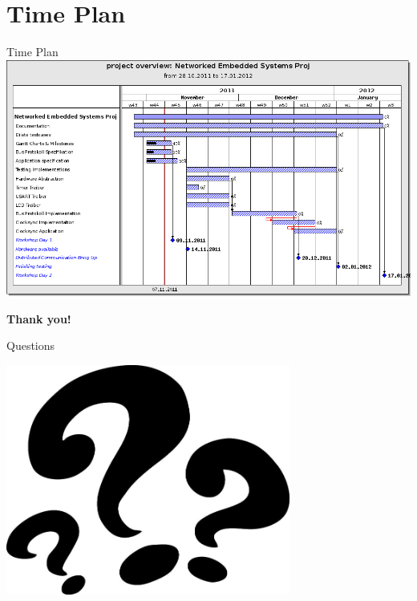 \documentclass{beamer}
\begin{document}
\section{Time Plan}
\begin{frame}{Time Plan}
\includegraphics[width=1.0\textwidth]{./images/201111_ganttchart.png}
\vspace{1cm}
\end{frame}

\begin{frame}
\begin{center}
\begin{Huge}\textbf{Thank you!}\end{Huge}
\end{center}
\end{frame}


\begin{frame}{Questions}
\begin{center}
\includegraphics[width=0.7\textwidth]{./images/question-marks.png}
\end{center}
\end{frame}
\end{document}
